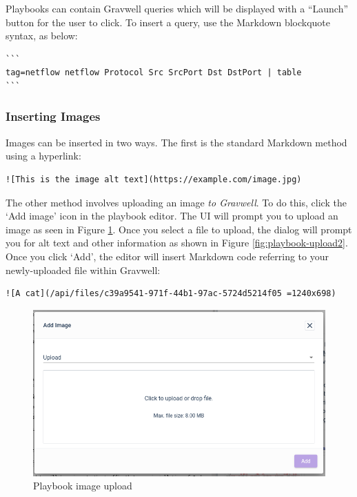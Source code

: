 Playbooks can contain Gravwell queries which will be displayed with a ``Launch'' button for the user to click. To insert a query, use the Markdown blockquote syntax, as below:

\begin{verbatim}
```
tag=netflow netflow Protocol Src SrcPort Dst DstPort | table
```
\end{verbatim}

\subsubsection{Inserting Images}

Images can be inserted in two ways. The first is the standard Markdown method using a hyperlink:

\begin{verbatim}
![This is the image alt text](https://example.com/image.jpg)
\end{verbatim}

The other method involves uploading an image \emph{to Gravwell}. To do this, click the `Add image' icon in the playbook editor. The UI will prompt you to upload an image as seen in Figure \ref{fig:playbook-upload}. Once you select a file to upload, the dialog will prompt you for alt text and other information as shown in Figure \ref{fig:playbook-upload2}. Once you click `Add', the editor will insert Markdown code referring to your newly-uploaded file within Gravwell:

\begin{verbatim}
![A cat](/api/files/c39a9541-971f-44b1-97ac-5724d5214f05 =1240x698)
\end{verbatim}

\begin{figure}[H]
	\includegraphics[width=0.6\linewidth]{images/playbook-upload.png}
	\caption{Playbook image upload}
	\label{fig:playbook-upload}
\end{figure}

